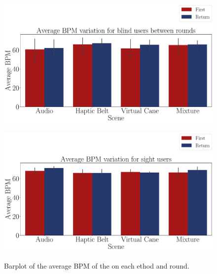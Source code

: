 \begin{figure}[!thb]
    \centering
    \begin{minipage}{\textwidth}
        \centering
        \includegraphics[width = \textwidth]{Resultados/ECG/Figuras/pdf/barplot_ecg_bpm_4_scene_blind.pdf}
        \label{fig:barplot_ecg_bpm_4_scene_blind}
    \end{minipage}
    \begin{minipage}{\textwidth}
        \centering
        \includegraphics[width = \textwidth]{Resultados/ECG/Figuras/pdf/barplot_ecg_bpm_4_scene_sight.pdf}
        \label{fig:barplot_ecg_bpm_4_scene_sight}
    \end{minipage}
    \caption{Barplot of the average BPM of the on each ethod and round.}
    \label{fig:barplot_ecg_bpm_4_scene_blind_sight}
\end{figure}

